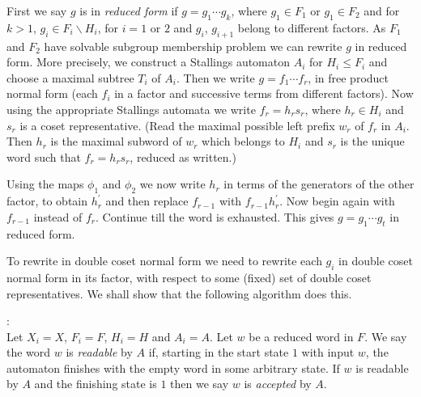 \documentclass[a4paper,12pt]{article}
\numberwithin{equation}{section}
\numberwithin{figure}{section}
\begin{document}
First we say $g$ is in \emph{reduced form} if $g = g_1 \cdots g_k$, where
$g_1 \in F_1$ or $g_1 \in F_2$ and 
for 
$k > 1$,    $g_i \in F_i \backslash H_i$, for $i=1$ or $2$ 
 and $g_i$, ${g_{i+1}}$ belong to different factors. As $F_1$ and 
$F_2$ have solvable subgroup membership problem we can rewrite $g$ in
reduced form. More precisely, we construct a Stallings automaton $A_i$ for
$H_i\le F_i$ and choose a maximal subtree $T_i$ of $A_i$. 
Then we write $g=f_1\cdots f_r$, in free product normal
form (each $f_i$ in a factor and successive terms from different factors).
Now using the appropriate Stallings automata we write $f_r=h_rs_r$, where
$h_r\in H_i$ and $s_r$ is a coset representative. (Read the maximal 
possible left prefix $w_r$ of $f_r$ in $A_i$. Then $h_r$ is the 
maximal subword of $w_r$ which belongs to $H_i$ and $s_r$ is the
unique word such that $f_r=h_rs_r$, reduced as written.)

Using the maps $\phi_1$ and $\phi_2$ we now write $h_r$ in terms of the
generators of the other factor, to obtain $h^\prime_r$ and then 
replace $f_{r-1}$ with $f_{r-1}h^\prime_r$. Now begin again with
$f_{r-1}$ instead of $f_r$. Continue till the word is exhausted.   
This gives $g=g_1\cdots g_t$ in reduced form.

To rewrite in double coset normal form we need to  
 rewrite
each $g_i$ in double coset normal form in its factor, 
with respect to some (fixed) set
of double coset representatives.  We shall show that the following algorithm does this.\\[1em]

\begin{comment}
${g = h_1(X_1)s_1h_2(X_2)t_2h_3(X_1) \cdots}$

$k=1 \Rightarrow$ $g \in F_1$ or $g \in F_2$



Let ${\Gamma_{H_1}}$ be a folded subgroup graph of $H_1$. Take two copies.

For some word $w = h_1sh_2$, the question is how to find $s$.\\[1em]
\end{comment}
:\\[1em]
Let $X_i=X$, $F_i=F$,  $H_i=H$ and  $A_i=A$.
Let $w$ be a reduced word in $F$. 
We say the word $w$ is {\em readable} by $A$ if, starting in the 
start state $1$ with input $w$, the automaton finishes with the empty
word in some arbitrary state. If $w$ is readable by $A$ and the finishing
state is $1$ then we say $w$ is {\em accepted} by $A$.  
  
\end{document}
